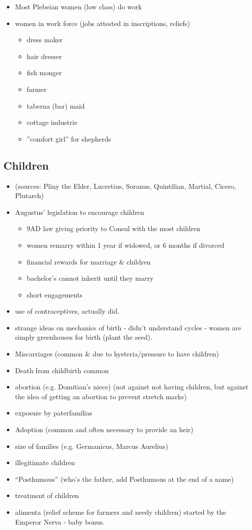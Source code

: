 \documentclass[12pt, twoside]{article}
\begin{document}
\begin{itemize}
\item Most Plebeian women (low class) do work
\item women in work force (jobs attested in inscriptions, reliefs)
	\begin{itemize}
	\item dress maker
	\item hair dresser
	\item fish monger
	\item farmer
	\item taberna (bar) maid
	\item cottage industrie
	\item ”comfort girl” for shepherds
	\end{itemize}
\end{itemize}

\subsection{Children}
\begin{itemize}
\item (sources: Pliny the Elder, Lucretius, Soranus, Quintilian, Martial, Cicero, Plutarch)
\item Augustus' legislation to encourage children
	\begin{itemize}
	\item 9AD law giving priority to Consul with the most children
	\item women remarry within 1 year if widowed, or 6 months if divorced
	\item financial rewards for marriage \& children
	\item bachelor’s cannot inherit until they marry
	\item short engagements
	\end{itemize}
\item use of contraceptives, actually did.
\item strange ideas on mechanics of birth - didn't understand cycles - women are simply greenhouses for birth (plant the seed).
\item Miscarriages (common \& due to hysteria/pressure to have children)
\item Death from childbirth common
\item abortion (e.g. Domitian's niece) (not against not having children, but against the idea of getting an abortion to prevent stretch marks)
\item exposure by paterfamilias
\item Adoption (common and often necessary to provide an heir)
\item size of families (e.g. Germanicus, Marcus Aurelius)
\item illegitimate children
\item “Posthumous” (who's the father, add Posthumous at the end of a name)
\item treatment of children
\item alimenta (relief scheme for farmers and needy children) started by the Emperor Nerva - baby bonus.
\end{itemize}
\end{document}

